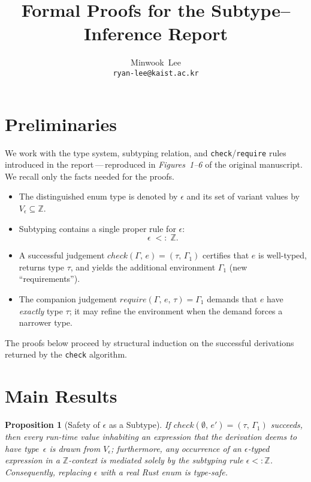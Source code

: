 \documentclass[peerreview, 10pt]{IEEEtran}
\newcommand{\Z}{\ensuremath{\mathbb{Z}}}
\newcommand{\checktype}[4]{\ensuremath{{check}(#1,\,#2)=(#3,\,#4)}}
\newcommand{\requiretype}[4]{\ensuremath{{require}(#1,\,#2,\,#3)=#4}}
\theoremstyle{plain}
\newtheorem{prop}{Proposition}
\begin{document}
\title{Formal Proofs for the Subtype--Inference Report}
\author{Minwook~Lee\\\texttt{ryan-lee@kaist.ac.kr}}
\maketitle

\section{Preliminaries}
We work with the type system, subtyping relation, and \texttt{check}/\texttt{require} rules introduced in the report\,---\,reproduced in \emph{Figures~1--6} of the original manuscript.  We recall only the facts needed for the proofs.

\begin{itemize}[leftmargin=*]
    \item The distinguished enum type is denoted by $\epsilon$ and its set of variant values by $V_{\epsilon} \subseteq \mathbb Z$.
    \item Subtyping contains a single proper rule for $\epsilon$: \[\epsilon \;<:\; \Z.\]
    \item A successful judgement $\checktype{\Gamma}{e}{\tau}{\Gamma_1}$ certifies that $e$ is well\nobreakdash-typed, returns type $\tau$, and yields the additional environment $\Gamma_1$ (new ``requirements'').
    \item The companion judgement $\requiretype{\Gamma}{e}{\tau}{\Gamma_1}$ demands that $e$ have \emph{exactly} type $\tau$; it may refine the environment when the demand forces a narrower type.
\end{itemize}

The proofs below proceed by structural induction on the successful derivations returned by the\linebreak
\texttt{check} algorithm.

\section{Main Results}

\begin{prop}[Safety of $\epsilon$ as a Subtype]\label{prop:safety}
If \mbox{$\checktype{\emptyset}{e'}{\tau}{\Gamma_1}$} succeeds, then every run\nobreakdash-time value inhabiting an expression that the derivation deems to have type~$\epsilon$ is drawn from $V_{\epsilon}$; furthermore, any occurrence of an $\epsilon$\nobreakdash-typed expression in a \Z-context is mediated solely by the subtyping rule $\epsilon<:\Z$.  Consequently, replacing $\epsilon$ with a real \textsf{Rust} enum is type\nobreakdash-safe.
\end{prop}
\end{document}
